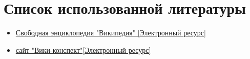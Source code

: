 \documentclass[a4paper,12pt]{article}
\begin{document}
\section*{Список использованной литературы}
\begin{itemize}
\item \href{https://pco.iis.nsk.su/grapp/index.php/%D0%94%D0%B5%D0%BA%D0%B0%D1%80%D1%82%D0%BE%D0%B2%D0%BE_%D0%BF%D1%80%D0%BE%D0%B8%D0%B7%D0%B2%D0%B5%D0%B4%D0%B5%D0%BD%D0%B8%D0%B5_%D0%B3%D1%80%D0%B0%D1%84%D0%BE%D0%B2}{Свободная энциклопедия "Википедия" [Электронный ресурс]}

\item \href{https://neerc.ifmo.ru/wiki/index.php?title=%D0%9C%D0%B0%D1%82%D1%80%D0%B8%D1%86%D0%B0_%D1%81%D0%BC%D0%B5%D0%B6%D0%BD%D0%BE%D1%81%D1%82%D0%B8_%D0%B3%D1%80%D0%B0%D1%84%D0%B0#:~:text=%D0%9E%D0%BF%D1%80%D0%B5%D0%B4%D0%B5%D0%BB%D0%B5%D0%BD%D0%B8%D0%B5%3A,%D0%BE%D0%B4%D0%B8%D0%BD%20%D1%80%D0%B0%D0%B7%2C%20%D0%B5%D1%81%D0%BB%D0%B8%20%D0%B3%D1%80%D0%B0%D1%84%20%D0%BE%D1%80%D0%B8%D0%B5%D0%BD%D1%82%D0%B8%D1%80%D0%BE%D0%B2%D0%B0%D0%BD.}{сайт "Вики-конспект"[Электронный ресурс]}

\end{itemize}
\end{document}
